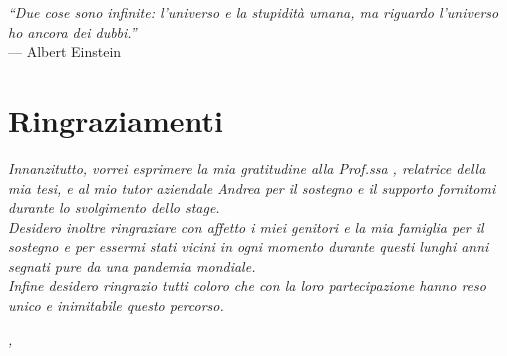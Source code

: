 \cleardoublepage
{}
{}

\begin{flushright}{
    \slshape
    ``Due cose sono infinite: l’universo e la stupidità umana, ma riguardo l’universo ho ancora dei dubbi.''} \\
    \medskip
    --- Albert Einstein
\end{flushright}


\bigskip

\begingroup
\let\clearpage\relax
\let\cleardoublepage\relax
\let\cleardoublepage\relax

\chapter*{Ringraziamenti}

\noindent \textit{Innanzitutto, vorrei esprimere la mia gratitudine alla Prof.ssa \myProf, relatrice della mia tesi, e al mio tutor aziendale Andrea per il sostegno e il supporto fornitomi durante lo svolgimento dello stage.}\\

\noindent \textit{Desidero inoltre ringraziare con affetto i miei genitori e la mia famiglia per il sostegno e per essermi stati vicini in ogni momento durante questi lunghi anni segnati pure da una pandemia mondiale.}\\

\noindent \textit{Infine desidero ringrazio tutti coloro che con la loro partecipazione hanno reso unico e inimitabile questo percorso.}\\
\bigskip

\noindent\textit{\myLocation, \myTime}
\hfill \myName

\endgroup
